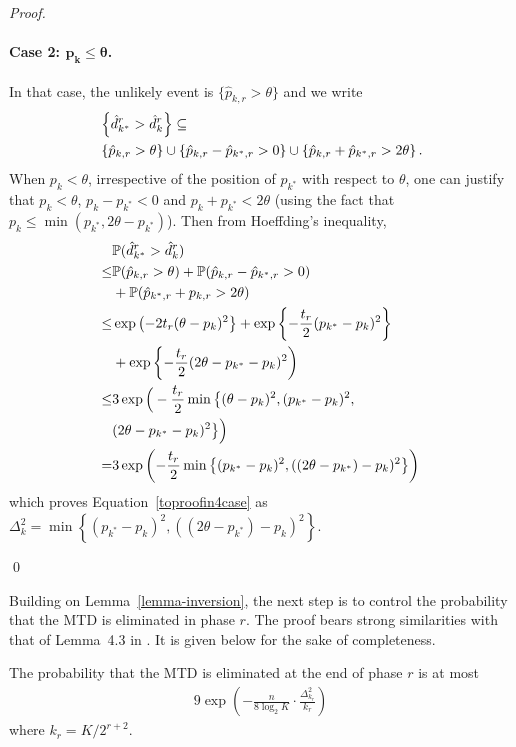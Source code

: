 \begin{proof}
\paragraph{Case 2: $\bm{p_k \leq \theta}$.} In that case, the unlikely event is $\{\hat{p}_{k,r} > \theta\}$ and we write 
\begin{align*}
&\Set{\hat{d}^r_{k^*} > \hat{d}^r_k} \subseteq
\\ &
\Set{\hat{p}_{k,r} > \theta} \cup \Set{\hat{p}_{{k},r} - \hat{p}_{k^*,r} > 0}\cup \Set{\hat{p}_{k,r} + \hat{p}_{{k^*},r} > 2\theta}.
\end{align*}
When $p_k < \theta$, irrespective of the position of $p_{k^*}$ with respect to $\theta$, one can justify that $p_k < \theta$, $p_{k} - p_{k^*} < 0$ and ${p}_{k} + {p}_{{k^*}} < 2\theta$ (using the fact that $p_k \leq \min(p_{k^*},2\theta - p_{k^*})$). Then from Hoeffding's inequality,  
\begin{align*}
&\mathbb{P}(\hat{d}^r_{k^*} > \hat{d}^r_k)
\\ \leq &
	\mathbb{P}(\hat{p}_{k,r} > \theta)
	+ \mathbb{P}(\hat{p}_{{k},r} - \hat{p}_{k^*,r} > 0)
\\&	+ \mathbb{P}(\hat{p}_{k^*,r} + p_{k,r} > 2\theta)
\\ \leq &
	\exp\left( -2t_r (\theta - p_k)^2 \right\}
	+ \exp\left\{ - \frac{t_r}{2} (p_{k^*} - p_k)^2 \right\}
\\ &
	+ \exp\left\{ - \frac{t_r}{2} (2\theta - p_{k^*} - p_k)^2 \right)
\\ \leq &
	3 \exp\Big( -\frac{t_r}{2} \min\big\{(\theta - p_k)^2,
		(p_{k^*} - p_k)^2,
\\&		(2\theta - p_{k^*} -p_k)^2
	  \big\} \Big)
\\ = &
	3 \exp\left( -\frac{t_r}{2} \min\left\{
		(p_{k^*} - p_{k})^2,
		((2\theta - p_{k^*}) - p_k)^2
	  \right\} \right)
\end{align*}
which proves Equation~\ref{toproofin4case} as 
\\
$\Delta_k^2 =\min\left\{
		(p_{k^*} - p_{k})^2,
		((2\theta - p_{k^*}) - p_k)^2
	  \right\}$. 

\qed
\end{proof}


Building on Lemma~\ref{lemma-inversion}, the next step is to control the probability that the MTD is eliminated in phase $r$. The proof bears strong similarities with that of Lemma~4.3 in \cite{icml2013_karnin13}. It is given below for the sake of completeness. 

%
%
\begin{lemma}
\label{lemma-best-survives}
The probability that the MTD is eliminated at the end of phase $r$ is at most
\begin{align*}
9 \exp\left(
	- \frac{n}{8 \log_2 K} \cdot \frac{\Delta^2_{k_r}}{k_r}
\right)	
\end{align*}
where $k_r = K/2^{r + 2}$.
\end{lemma}
%
%

